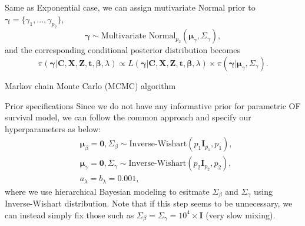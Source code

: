 \documentclass[a4paper, 12pt]{article}
\makeatletter
\renewcommand{\section}{\@startsection
	{section}    {1}    {0mm}    {-0.7\baselineskip}    {0.08\baselineskip}    {\normalfont\large\sc\center\bf}}
\renewcommand{\subsection}{\@startsection
	{subsection}    {2}    {0mm}    {-0.5\baselineskip}    {0.01\baselineskip}    {\normalfont\normalsize\itshape\center}}
\makeatother
\begin{document}
Same as Exponential case, we can assign mutivariate Normal prior to $\mathbf{\gamma}=\{\gamma_1,...,\gamma_{p_2}\}$,
\begin{equation}
\mathbf{\gamma} \sim \mbox{Multivariate Normal}_{p_2}(\mathbf{\mu}_{\gamma}, \Sigma_{\gamma}),
\end{equation}
and the corresponding conditional posterior distribution becomes 
\begin{equation}
\pi(\mathbf{\gamma}|\mathbf{C}, \mathbf{X}, \mathbf{Z}, \mathbf{t}, \mathbf{\beta}, \lambda) \propto L(\mathbf{\gamma}|\mathbf{C}, \mathbf{X}, \mathbf{Z}, \mathbf{t}, \mathbf{\beta}, \lambda)\times \pi(\mathbf{\gamma}|\mathbf{\mu}_{\gamma}, \Sigma_{\gamma}).
\end{equation}
\section{Markov chain Monte Carlo (MCMC) algorithm}
\subsection{Prior specifications}
\noindent Since we do not have any informative prior for parametric OF survival model, we can follow the common approach and specify our hyperparameters as below:  
\begin{equation}
\begin{aligned}
&\mathbf{\mu}_{\beta} = \mathbf{0}, \Sigma_{\beta} \sim \mbox{Inverse-Wishart}(p_1\mathbf{I}_{p_1}, p_1),\\
& \mathbf{\mu}_{\gamma} = \mathbf{0}, \Sigma_{\gamma} \sim \mbox{Inverse-Wishart}(p_2\mathbf{I}_{p_2}, p_2), \\
& a_{\lambda} =  b_{\lambda} = 0.001,
\end{aligned}
\end{equation}
where we use hierarchical Bayesian modeling to esitmate $\Sigma_{\beta}$ and $\Sigma_{\gamma}$ using Inverse-Wishart distribution. Note that if this step seems to be unnecessary, we can instead simply fix those such as $\Sigma_{\beta} =\Sigma_{\gamma} = 10^4\times\mathbf{I}$ (very slow mixing). 
\end{document}
